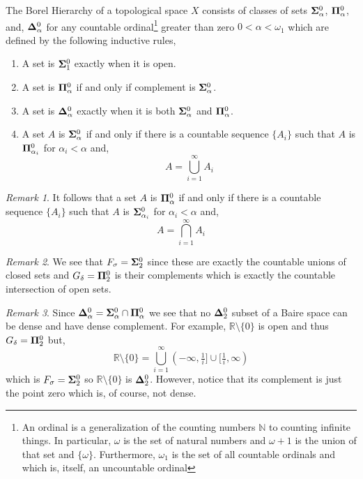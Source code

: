 \documentclass{article}
\newcommand{\N}{\mathbb{N}}
\newcommand{\R}{\mathbb{R}}
\newenvironment{definition}[1][Definition:]{\begin{trivlist}
\item[\hskip \labelsep {\bfseries #1}]}{\end{trivlist}}
\theoremstyle{theorem}
\theoremstyle{definition}
\theoremstyle{definition}
\theoremstyle{remark}
\theoremstyle{definition}
\theoremstyle{remark}
\newtheorem{remark}{Remark}[subsection]
\begin{document}
\begin{definition}
The Borel Hierarchy of a topological space $X$ consists of classes of sets $\mathbf{\Sigma}^0_{\alpha}$, $\mathbf{\Pi}^0_{\alpha}$, and, $\mathbf{\Delta}^0_{\alpha}$ for any countable ordinal\footnote{An ordinal is a generalization of the counting numbers $\N$ to counting infinite things. In particular, $\omega$ is the set of natural numbers and $\omega + 1$ is the union of that set and $\{ \omega \}$. Furthermore, $\omega_1$ is the set of all countable ordinals and which is, itself, an uncountable ordinal} greater than zero $0 < \alpha < \omega_1$ which are defined by the following inductive rules,
\begin{enumerate}
\item A set is $\mathbf{\Sigma}^0_{1}$ exactly when it is open.
\item A set is $\mathbf{\Pi}^0_{\alpha}$ if and only if complement is $\mathbf{\Sigma}^0_{\alpha}$.
\item A set is $\mathbf{\Delta}^0_{\alpha}$ exactly when it is both $\mathbf{\Sigma}^0_{\alpha}$ and $\mathbf{\Pi}^0_{\alpha}$.
\item A set $A$ is $\mathbf{\Sigma}^0_{\alpha}$ if and only if there is a countable sequence $\{ A_i \}$ such that $A$ is $\mathbf{\Pi}^0_{\alpha_i}$ for $\alpha_i < \alpha$ and,
\[ A = \bigcup_{i = 1}^{\infty} A_i \]
\end{enumerate}
\end{definition}

\begin{remark}
It follows that a set $A$ is $\mathbf{\Pi}^0_{\alpha}$ if and only if there is a countable sequence $\{ A_i \}$ such that $A$ is $\mathbf{\Sigma}^0_{\alpha_i}$ for $\alpha_i < \alpha$ and,
\[ A = \bigcap_{i = 1}^{\infty} A_i \]
\end{remark}

\begin{remark}
We see that $F_{\sigma} = \mathbf{\Sigma}^0_{2}$ since these are exactly the countable unions of closed sets and $G_{\delta} = \mathbf{\Pi}^0_{2}$ is their complements which is exactly the countable intersection of open sets. 
\end{remark}

\begin{remark}
Since $\mathbf{\Delta}^0_{\alpha} = \mathbf{\Sigma}^0_{\alpha} \cap \mathbf{\Pi}^0_{\alpha}$ we see that no $\mathbf{\Delta}^0_{2}$ subset of a Baire space can be dense and have dense complement. For example, $\R \setminus \{0\}$ is open and thus $G_{\delta} = \mathbf{\Pi}^0_{2}$ but,
\[ \R \setminus \{0\} = \bigcup_{i = 1}^{\infty} (-\infty, \tfrac{1}{i}] \cup [\tfrac{1}{i}, \infty) \]
which is $F_{\sigma} = \mathbf{\Sigma}^0_{2}$ so $\R \setminus \{0\}$ is $\mathbf{\Delta}^0_{2}$. However, notice that its complement is just the point zero which is, of course, not dense. 
\end{remark}
\end{document}
